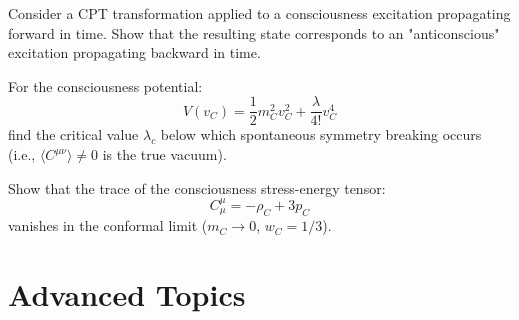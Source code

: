 \begin{exercise}
Consider a CPT transformation applied to a consciousness excitation propagating forward in time. Show that the resulting state corresponds to an "anticonscious" excitation propagating backward in time.
\end{exercise}

\begin{exercise}
For the consciousness potential:
\begin{equation}
V(v_C) = \frac{1}{2}m_C^2 v_C^2 + \frac{\lambda}{4!} v_C^4
\end{equation}
find the critical value $\lambda_c$ below which spontaneous symmetry breaking occurs (i.e., $\langle C^{\mu\nu} \rangle \neq 0$ is the true vacuum).
\end{exercise}

\begin{exercise}
Show that the trace of the consciousness stress-energy tensor:
\begin{equation}
C^\mu_\mu = -\rho_C + 3p_C
\end{equation}
vanishes in the conformal limit ($m_C \to 0$, $w_C = 1/3$).
\end{exercise}

\section{Advanced Topics}

